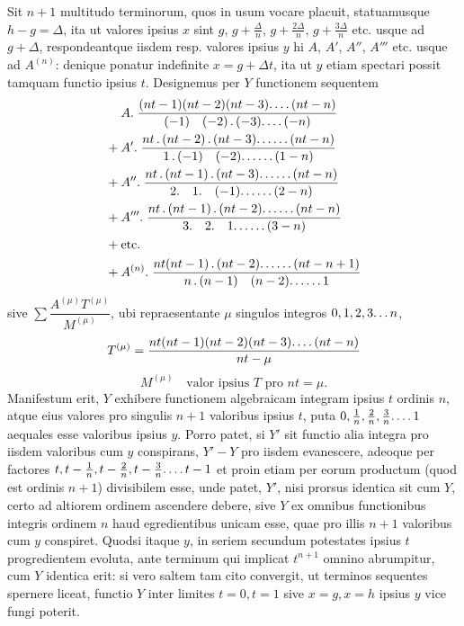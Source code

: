 Sit $n+1$ multitudo terminorum, quos in usum vocare placuit, statuamusque
$h-g=\Delta$, ita ut valores ipsius $x$ sint $g$, $g+\frac{\Delta}{n}$,
$g+\frac{2\Delta}{n}$, $g+\frac{3\Delta}{n}$ etc. usque ad $g+\Delta$,
respondeantque iisdem resp. valores ipsius $y$ hi $A$, $A'$, $A''$, $A'''$
etc. usque ad $A^{(n)}$: denique ponatur indefinite $x=g+\Delta t$, ita ut
$y$ etiam spectari possit tamquam functio ipsius $t$. Designemus per $Y$
functionem sequentem
\[
\begin{aligned}
&A.\;\frac{(nt-1)(nt-2)(nt-3)\ldotp\ldotp\ldotp\ldotp(nt-n)}{(-1)\quad(-2)\, .\,(-3)\ldotp\ldotp\ldotp\ldotp(-n)}\\
{}+{}&A'.\;\frac{nt\, .\,(nt-2)\, .\,(nt-3)\ldotp\ldotp\ldotp\ldotp\ldotp\ldotp(nt-n)}{1\, .\,(-1)\quad(-2)\ldotp\ldotp\ldotp\ldotp\ldotp\ldotp(1-n)}\\
{}+{}&A''.\;\frac{nt\, .\,(nt-1)\, .\,(nt-3)\ldotp\ldotp\ldotp\ldotp\ldotp\ldotp(nt-n)}{2.\quad1.\quad(-1)\ldotp\ldotp\ldotp\ldotp\ldotp\ldotp(2-n)}\\
{}+{}&A'''.\;\frac{nt\, .\,(nt-1)\, .\,(nt-2)\ldotp\ldotp\ldotp\ldotp\ldotp\ldotp(nt-n)}{3.\quad2.\quad1\ldotp\ldotp\ldotp\ldotp\ldotp\ldotp(3-n)}\\
{}+{}&\text{etc.}\\
{}+{}&A^{(n)}.\;\frac{nt(nt-1)\, .\,(nt-2)\ldotp\ldotp\ldotp\ldotp\ldotp\ldotp(nt-n+1)}{n\, .\,(n-1)\quad(n-2)\ldotp\ldotp\ldotp\ldotp\ldotp\ldotp1}
\end{aligned}
\]
sive $\sum\dfrac{A^{(\mu)}T^{(\mu)}}{M^{(\mu)}}$, ubi repraesentante $\mu$ singulos integros $0,1,2,3\ldotp\ldotp\ldotp n$,
\[
T^{(\mu)}=\frac{nt(nt-1)(nt-2)(nt-3)\ldotp\ldotp\ldotp\ldotp(nt-n)}{nt-\mu}
\]
\[
M^{(\mu)}\quad\text{valor ipsius }T\text{ pro }nt=\mu.
\]
Manifestum erit, $Y$ exhibere functionem algebraicam integram ipsius $t$ ordinis $n$, atque eius valores pro singulis $n+1$ valoribus ipsius $t$, puta $0,\frac1n,\frac2n,\frac3n\ldotp\ldotp\ldotp\ldotp1$ aequales esse valoribus ipsius $y$. Porro patet, si $Y'$ sit functio alia integra pro iisdem valoribus cum $y$ conspirans, $Y'-Y$ pro iisdem evanescere, adeoque per factores $t,t-\frac1n,t-\frac2n,t-\frac3n\ldotp\ldotp\ldotp\ldotp t-1$ et proin etiam per eorum productum (quod est ordinis $n+1$) divisibilem esse, unde patet, $Y'$, nisi prorsus identica sit cum $Y$, certo ad altiorem ordinem ascendere debere, sive $Y$ ex omnibus functionibus integris ordinem $n$ haud egredientibus unicam esse, quae pro illis $n+1$ valoribus cum $y$ conspiret. Quodsi itaque $y$, in seriem secundum potestates ipsius $t$ progredientem evoluta, ante terminum qui implicat $t^{n+1}$ omnino abrumpitur, cum $Y$ identica erit: si vero saltem tam cito convergit, ut terminos sequentes spernere liceat, functio $Y$ inter limites $t=0,t=1$ sive $x=g,x=h$ ipsius $y$ vice fungi poterit.

